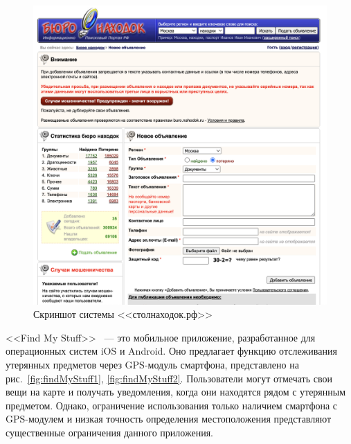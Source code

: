 \documentclass{../mirea}
\begin{document}
	\begin{figure}[htb]
		\centering
		\includegraphics[width=.95\textwidth]{../images/stolNahodok2}
		\parskip=6pt
		\caption{Скриншот системы <<столнаходок.рф>>}
		\label{fig:stolNahodok2}
	\end{figure}
	
	<<Find My Stuff>>~\cite{bib:find_my_stuff} --- это мобильное приложение, разработанное для операционных систем iOS и Android. Оно предлагает функцию отслеживания утерянных предметов через GPS-модуль смартфона, представлено на рис.~\ref{fig:findMyStuff1}, \ref{fig:findMyStuff2}. Пользователи могут отмечать свои вещи на карте и получать уведомления, когда они находятся рядом с утерянным предметом. Однако, ограничение использования только наличием смартфона с GPS-модулем и низкая точность определения местоположения представляют существенные ограничения данного приложения.
	
\end{document}
